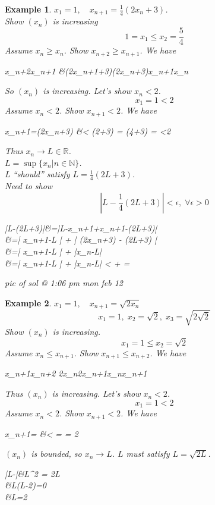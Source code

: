 \documentclass{report}
\newcommand{\N}{\mathbb{N}}  %
\newcommand{\bbR}{\mathbb{R}}  %
\theoremstyle{mystyle}
\newtheorem*{example}{Example}
\theoremstyle{customtheorem}
\newcommand{\ex}[1]{    \begin{example}{#1}\end{example}             }
\begin{document}
    \ex{
        $x_1=1,\quad x_{n+1}=(2x_n+3)$.\\
        Show $(x_n)$ is increasing
        \[1=x_1\leq x_2=\frac{5}{4}\]
        Assume $x_n \geq x_n$. Show $x_{n+2}\geq x_{n+1}$. We have
        \begin{flalign*}
            x_{n+2}\geq x_{n+1} &\iff \frac{1}{4}(2x_{n+1}+3)\geq \frac{1}{4}(2x_n+3)\iff x_{n+1}\geq x_n
        \end{flalign*}
        So $(x_n)$ is increasing. Let's show $x_n<2$.
        \[x_1=1<2\]
        Assume $x_n<2$. Show $x_{n+1}<2$. We have
        \begin{flalign*}
            x_{n+1}=\frac{1}{4}(2x_n+3) &< \frac{1}{4}(2\cdot 2+3) = \frac{1}{4}(4+3) = \frac{7}{4} <2
        \end{flalign*}
        Thus $x_n\rightarrow L\in \bbR$. \\
        $L=\sup\{x_n\vert n\in\N\}$. \\
        L ``should'' satisfy $L=\frac{1}{4}(2L+3)$.\\
        Need to show \[\left| L - \frac{1}{4}(2L+3)\right| < \epsilon,\; \forall \epsilon > 0\]
        \begin{flalign*}
            \left|L-\frac{1}{4}(2L+3)\right|&=\left|L-x_{n+1}+x_{n+1}-\frac{1}{4}(2L+3)\right|\\
            &=\left| x_{n+1}-L \right| + \left| \frac{1}{4}(2x_n+3) - \frac{1}{4}(2L+3) \right|\\
            &=\left| x_{n+1}-L \right| + \frac{1}{2}\left|x_n-L\right|\\
            &=\left| x_{n+1}-L \right| + \left|x_n-L\right| < \frac{\epsilon}{2} + \frac{\epsilon}{2} = \epsilon
        \end{flalign*}
        pic of sol @ 1:06 pm mon feb 12
    }

    \ex{
        $x_1=1, \quad x_{n+1}=$
        \[x_1=1,\; x_2=\sqrt{2},\; x_3=\sqrt{2\sqrt{2}}\]
        Show $(x_n)$ is increasing.
        \[x_1=1\leq x_2=\sqrt{2}\]
        Assume $x_n\leq x_{n+1}$. Show $x_{n+1}\leq x_{n+2}$. We have
        \begin{flalign*}
            x_{n+1}\leq x_{n+2} \iff \sqrt{2x_n}\leq \sqrt{2x_{n+1}}\iff 2x_n\leq 2x_{n+1}\iff x_n\leq x_{n+1}
        \end{flalign*}
        Thus $(x_n)$ is increasing. Let's show $x_n<2$.
        \[x_1=1<2\]
        Assume $x_n<2$. Show $x_{n+1}<2$. We have
        \begin{flalign*}
            x_{n+1}=\sqrt{2x_n} &< \sqrt{2\cdot 2} = \sqrt{4} = 2
        \end{flalign*}
        $(x_n)$ is bounded, so $x_n\rightarrow L$.
        $L$ must satisfy $L=\sqrt{2L}$.
        \begin{flalign*}
            \left|L-\sqrt{2L}\right|&\implies L^2 = 2L\\
            &\implies L(L-2)=0 \\
            &\implies L=2
        \end{flalign*}
    }
\end{document}
